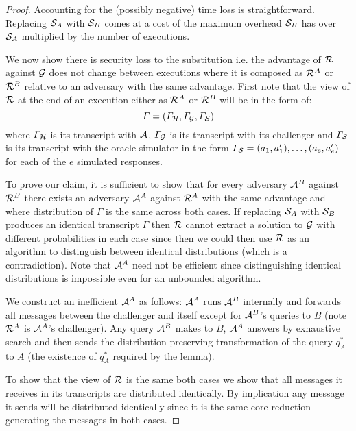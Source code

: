 \begin{proof}

  Accounting for the (possibly negative) time loss is straightforward.
  Replacing $\mathcal{S}_{A}$ with $\mathcal{S}_{B}$ comes at a cost of the maximum overhead $\mathcal{S}_{B}$ has over $\mathcal{S}_{A}$ multiplied by the number of executions.

  We now show there is security loss to the substitution i.e. the advantage of $\mathcal{R}$ against $\mathcal{G}$ does not change between executions where it is composed as $\mathcal{R}^{A}$ or $\mathcal{R}^{B}$ relative to an adversary with the same advantage.
  First note that the view of $\mathcal{R}$ at the end of an execution either as $\mathcal{R}^{A}$ or $\mathcal{R}^{B}$ will be in the form of:
  \[ \varGamma = (\varGamma_{\mathcal{H}},\varGamma_{\mathcal{G}}, \varGamma_{\mathcal{S}}) \]
  where $\varGamma_{\mathcal{H}}$ is its transcript with $\mathcal{A}$, $\varGamma_{\mathcal{G}}$ is its transcript with its challenger and $\varGamma_{\mathcal{S}}$ is its transcript with the oracle simulator in the form $\varGamma_{\mathcal{S}} = (a_1,a'_1), \dots, (a_e,a'_e)$ for each of the $e$ simulated responses.

  To prove our claim, it is sufficient to show that for every adversary $\mathcal{A}^{B}$ against $\mathcal{R}^{B}$ there exists an adversary $\mathcal{A}^{A}$ against $\mathcal{R}^{A}$ with the same advantage and where distribution of $\varGamma$ is the same across both cases.
  If replacing $\mathcal{S}_{A}$ with $\mathcal{S}_{B}$ produces an identical transcript $\varGamma$ then $\mathcal{R}$ cannot extract a solution to $\mathcal{G}$ with different probabilities in each case since then we could then use $\mathcal{R}$ as an algorithm to distinguish between identical distributions (which is a contradiction).
  Note that $\mathcal{A}^{A}$ need not be efficient since distinguishing identical distributions is impossible even for an unbounded algorithm.

  We construct an inefficient $\mathcal{A}^{A}$ as follows:
  $\mathcal{A}^{A}$ runs $\mathcal{A}^{B}$ internally and forwards all messages between the challenger and itself except for $\mathcal{A}^{B}$'s queries to $B$ (note $\mathcal{R}^{A}$ is $\mathcal{A}^{A}$'s challenger).
  Any query $\mathcal{A}^{B}$ makes to $B$, $\mathcal{A}^{A}$ answers by exhaustive search and then sends the distribution preserving transformation of the query $q_{A}^{*}$ to $A$ (the existence of $q_{A}^{*}$ required by the lemma).

  To show that the view of $\mathcal{R}$ is the same both cases we show that all messages it receives in its transcripts are distributed identically.
  By implication any message it sends will be distributed identically since it is the same core reduction generating the messages in both cases.


\end{proof}
